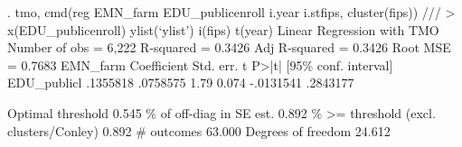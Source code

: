 . tmo, cmd(reg EMN_farm EDU_publicenroll i.year i.stfips, cluster(fips)) ///
>     x(EDU_publicenroll) ylist(`ylist') i(fips) t(year)
{\smallskip}
Linear Regression with TMO                              Number of obs =  6,222
                                                        R-squared     = 0.3426
                                                        Adj R-squared = 0.3426
                                                        Root MSE      = 0.7683
{\smallskip}
    EMN_farm {\VBAR} Coefficient  Std. err.      t    P>|t|     [95\% conf. interval]
EDU_public{\tytilde}l {\VBAR}   .1355818   .0758575     1.79   0.074    -.0131541    .2843177
                                                                               
                                                   Optimal threshold      0.545
                                            \% of off-diag in SE est.      0.892
                              \% >= threshold (excl. clusters/Conley)      0.892
                                                          \# outcomes     63.000
                                                  Degrees of freedom     24.612
